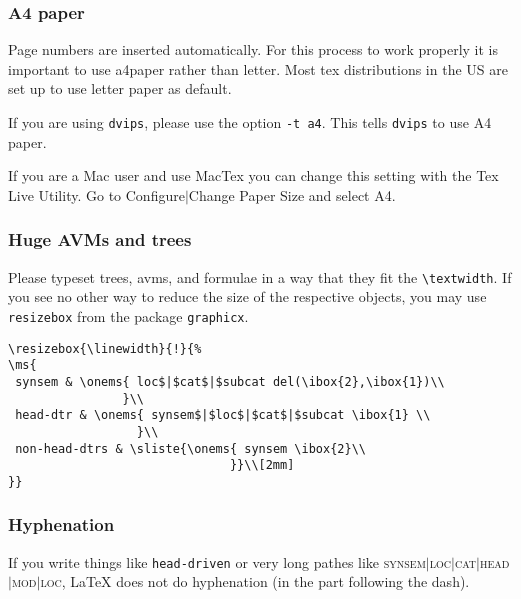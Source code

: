 \documentclass[11pt,a4paper,fleqn]{article}
\begin{document}
\subsubsection{A4 paper}

Page numbers are inserted automatically. For this process to work properly it is important to use
a4paper rather than letter. Most tex distributions in the US are set up to use letter paper as default.

If you are using \verb+dvips+, please use the option \verb+-t a4+. This tells
\verb+dvips+ to use A4 paper.


If you are a Mac user and use MacTex you can change this setting with the Tex Live Utility. Go to
Configure$|$Change Paper Size and select A4.

\subsubsection{Huge AVMs and trees}
\label{huge}

Please typeset trees, avms, and formulae in a way that they fit the
\verb+\textwidth+. If you see no other way to reduce the size of the respective
objects, you may use \verb+resizebox+ from the package \verb+graphicx+.
{\small
\begin{verbatim}
\resizebox{\linewidth}{!}{%
\ms{
 synsem & \onems{ loc$|$cat$|$subcat del(\ibox{2},\ibox{1})\\
                }\\
 head-dtr & \onems{ synsem$|$loc$|$cat$|$subcat \ibox{1} \\
                  }\\
 non-head-dtrs & \sliste{\onems{ synsem \ibox{2}\\ 
                               }}\\[2mm]
}}
\end{verbatim}
}


\subsubsection{Hyphenation}
\label{hyphenation}

If you write things like \verb+head-driven+ or very long pathes like
\textsc{synsem$|$loc$|$cat$|$head$|$mod$|$loc}, \LaTeX{} does not do hyphenation
(in the part following the dash).
\end{document}
